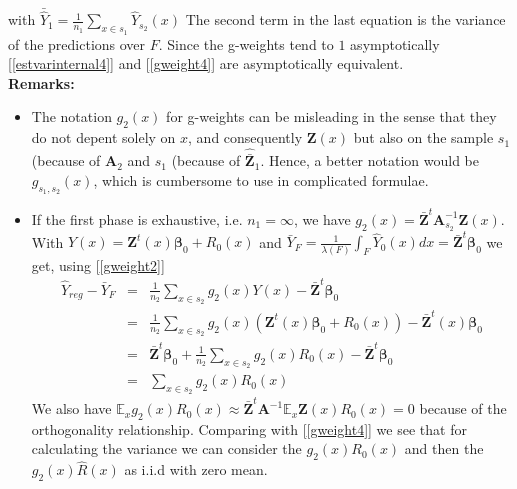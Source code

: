 \documentclass[a4paper,12pt,leqno, titlepage]{article}
\newcommand{\EX}{\mathbb{E}}
\begin{document}
with $\bar{\hat{Y}}_{1}=\frac{1}{n_1}\sum_{x\in{s_1}}\hat{Y}_{s_2}(x)$
 The second term in the last equation is the variance of the predictions over $F$. Since the g-weights tend to $1$ asymptotically  [\ref{estvarinternal4}] and [\ref{gweight4}] are asymptotically equivalent. \\
 \noindent \textbf{Remarks:}
 \begin{itemize}
 \item
 The notation $g_2(x)$ for g-weights can be misleading in the sense that they do not depent solely on $x$, and consequently $\pmb{Z}(x)$ but also on the sample $s_1$ (because of $\pmb{A}_2$ and $s_1$ (because of $\hat{\bar{\pmb{Z}}}_{1}$. Hence, a better notation would be $g_{s_1,s_2}(x)$, which is cumbersome to use in complicated formulae.
 \item
 If the first phase is exhaustive, i.e. $n_1=\infty$, we have $g_{2}(x)=\bar{\pmb{Z}}^t\pmb{A}^{-1}_{s_2}\pmb{Z}(x)$. With $Y(x)=\pmb{Z}^t(x)\pmb{\beta}_0+R_0(x)$ and $\bar{Y}_F=\frac{1}{\lambda(F)}\int_F \hat{Y}_0(x)dx=\bar{\pmb{Z}}^t\pmb{\beta}_0$ we get, using
 [\ref{gweight2}]
 \begin{eqnarray*}
 \hat{Y}_{reg}-\bar{Y}_F &=&\frac{1}{n_2}\sum_{x\in{s_2}}g_2(x)Y(x)-\bar{\pmb{Z}}^t\pmb{\beta}_0  \\
 &=&\frac{1}{n_2}\sum_{x\in{s_2}}g_2(x)(\pmb{Z}^t(x)\pmb{\beta}_0+R_0(x))-\bar{\pmb{Z}}^t(x)\pmb{\beta}_0\\
 &=& \bar{\pmb{Z}}^t\pmb{\beta}_0+\frac{1}{n_2}\sum_{x\in{s_2}}g_2(x)R_0(x)-\bar{\pmb{Z}}^t\pmb{\beta}_0\\
 &=& \sum_{x\in{s_2}}g_2(x)R_0(x)
 \end{eqnarray*}
 We also have $\EX_x g_2(x)R_0(x)\approx \bar{\pmb{Z}}^t\pmb{A}^{-1}\EX_x \pmb{Z}(x)R_0(x)=0$
 because of the orthogonality relationship. Comparing with [\ref{gweight4}] we see that for calculating the variance we can consider the $g_2(x)R_0(x)$ and then the $g_{2}(x)\hat{R}(x)$ as i.i.d with zero mean.
 \end{itemize}
\end{document}
